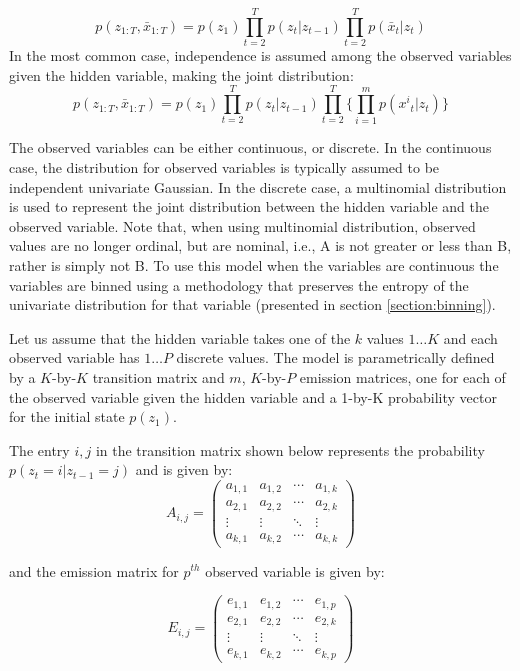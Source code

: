 \begin{equation}
p(z_{1:T},\bar{x}_{1:T})=p(z_1)\prod_{t=2}^T p(z_t|z_{t-1}) \prod_{t=2}^T p(\bar{x}_t|z_t)
\end{equation}
In the most common case, independence is assumed among the observed variables given the hidden variable, making the joint distribution:
\begin{equation}
p(z_{1:T},\bar{x}_{1:T})=p(z_1)\prod_{t=2}^T p(z_t|z_{t-1}) \prod_{t=2}^T \{ \prod_{i=1}^m p({x^i}_t|z_t)\}
\end{equation}

The observed variables can be either continuous, or discrete. In the continuous case, the distribution for observed variables is typically assumed to be independent univariate Gaussian. In the discrete case, a multinomial distribution is used to represent the joint distribution between the hidden variable and the observed variable.  Note that, when using multinomial distribution, observed values are no longer ordinal, but are nominal, i.e., A is not greater or less than B, rather is simply not B. To use this model when the variables are continuous the variables are binned using a methodology that preserves the entropy of the univariate distribution for that variable (presented in section \ref{section:binning}).

Let us assume that the hidden variable takes one of the $k$ values $1 \dots K$ and each observed variable has $1 \dots P$ discrete values. The model is parametrically defined by a $K$-by-$K$ transition matrix and $m$,  $K$-by-$P$ emission matrices, one for each of the observed variable given the hidden variable and a 1-by-K probability vector for the initial state $p(z_1)$. 

The entry $i,j$ in the transition matrix shown below represents the probability $p(z_t=i |z_{t-1}=j)$ and is given by: 
\begin{equation}
A_{i,j} =
 \begin{pmatrix}
  a_{1,1} & a_{1,2} & \cdots & a_{1,k} \\
  a_{2,1} & a_{2,2} & \cdots & a_{2,k} \\
  \vdots  & \vdots  & \ddots & \vdots  \\
  a_{k,1} & a_{k,2} & \cdots & a_{k,k}
 \end{pmatrix}
\end{equation}

and the emission matrix for $p^{th}$ observed variable is given by:

\begin{equation}
E_{i,j} =
 \begin{pmatrix}
  e_{1,1} & e_{1,2} & \cdots & e_{1,p} \\
  e_{2,1} & e_{2,2} & \cdots & e_{2,k} \\
  \vdots  & \vdots  & \ddots & \vdots  \\
  e_{k,1} & e_{k,2} & \cdots & e_{k,p}
 \end{pmatrix}
\end{equation}



